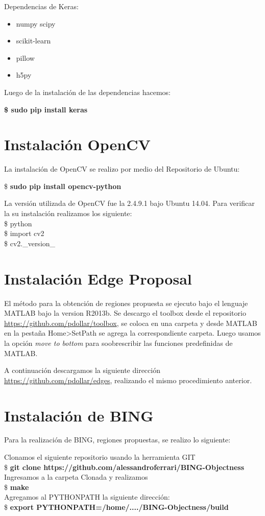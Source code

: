 Dependencias de Keras:
\begin{itemize}
\item numpy scipy
\item scikit-learn
\item pillow
\item h5py
\end{itemize}
Luego de la instalación de las dependencias hacemos:

 \textbf{\$ sudo pip install keras}
\section{Instalación OpenCV}\label{sec:instalacionopencv}
La instalación de OpenCV se realizo por medio del Repositorio de Ubuntu:

\$\textbf{ sudo pip install opencv-python}

La versión utilizada de OpenCV fue la 2.4.9.1 bajo Ubuntu 14.04. Para verificar la su instalación realizamos los siguiente:\\
\$ python\\
\$ import cv2\\
\$ cv2.\_version\_


\section{Instalación Edge Proposal }\label{sec:instalacionedge}
El método para la obtención de regiones propuesta se ejecuto bajo el lenguaje MATLAB bajo la version R2013b. Se descargo el toolbox desde el repositorio \url{https://github.com/pdollar/toolbox}, se coloca en una carpeta y desde MATLAB en la pestaña Home>SetPath se agrega la correspondiente carpeta. Luego usamos la opción \textit{move to bottom} para soobrescribir las funciones predefinidas de MATLAB.

A continuación descargamos la siguiente dirección \url{https://github.com/pdollar/edges}, realizando el mismo procedimiento anterior.


\section{Instalación de BING}
Para la realización de BING, regiones propuestas, se realizo lo siguiente:

Clonamos el siguiente repositorio usando la herramienta GIT\\
\$\textbf{ git clone https://github.com/alessandroferrari/BING-Objectness}
Ingresamos a la carpeta Clonada y realizamos \\
\$ \textbf{make} \\
Agregamos al PYTHONPATH la siguiente dirección:\\
\$ \textbf{export PYTHONPATH=/home/..../BING-Objectness/build} \\

